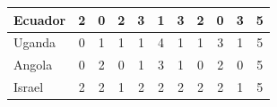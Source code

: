 \documentclass[12pt]{article}  %
\begin{document}
\begin{subappendices}
\begin{longtable}{|l|c|c|c|c|c|c|c|c|c|c|}
	\hline
	Ecuador                                                        & 2                                                                      & 0                                                                      & 2                                                                      & 3                                                                      & 1                                                                      & 3                                                                      & 2                         & 0                           & 3                           & 5                           \\ 
	\hline
	Uganda                                                         & 0                                                                      & 1                                                                      & 1                                                                      & 1                                                                      & 4                                                                      & 1                                                                      & 1                         & 3                           & 1                           & 5                           \\ 
	\hline
	Angola                                                         & 0                                                                      & 2                                                                      & 0                                                                      & 1                                                                      & 3                                                                      & 1                                                                      & 0                         & 2                           & 0                           & 5                           \\ 
	\hline
	Israel                                                         & 2                                                                      & 2                                                                      & 1                                                                      & 2                                                                      & 2                                                                      & 2                                                                      & 2                         & 2                           & 1                           & 5                           \\ 

\end{longtable}
\end{subappendices}
\end{document}

